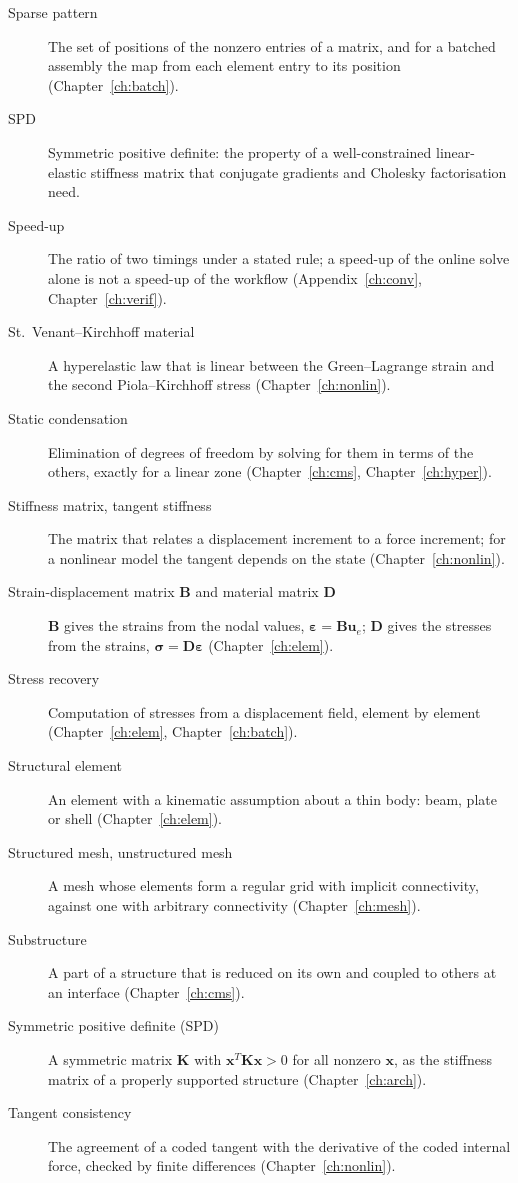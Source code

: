 \begin{description}
\item[Sparse pattern] The set of positions of the nonzero entries of a matrix, and for a batched assembly the map from each element entry to its position (Chapter~\ref{ch:batch}).
\item[SPD] Symmetric positive definite: the property of a well-constrained linear-elastic stiffness matrix that conjugate gradients and Cholesky factorisation need.
\item[Speed-up] The ratio of two timings under a stated rule; a speed-up of the online solve alone is not a speed-up of the workflow (Appendix~\ref{ch:conv}, Chapter~\ref{ch:verif}).
\item[St.~Venant--Kirchhoff material] A hyperelastic law that is linear between the Green--Lagrange strain and the second Piola--Kirchhoff stress (Chapter~\ref{ch:nonlin}).
\item[Static condensation] Elimination of degrees of freedom by solving for them in terms of the others, exactly for a linear zone (Chapter~\ref{ch:cms}, Chapter~\ref{ch:hyper}).
\item[Stiffness matrix, tangent stiffness] The matrix that relates a displacement increment to a force increment; for a nonlinear model the tangent depends on the state (Chapter~\ref{ch:nonlin}).
\item[Strain-displacement matrix $\bm B$ and material matrix $\bm D$] $\bm B$ gives the strains from the nodal values, $\bm\varepsilon=\bm B\bm u_e$; $\bm D$ gives the stresses from the strains, $\bm\sigma=\bm D\bm\varepsilon$ (Chapter~\ref{ch:elem}).
\item[Stress recovery] Computation of stresses from a displacement field, element by element (Chapter~\ref{ch:elem}, Chapter~\ref{ch:batch}).
\item[Structural element] An element with a kinematic assumption about a thin body: beam, plate or shell (Chapter~\ref{ch:elem}).
\item[Structured mesh, unstructured mesh] A mesh whose elements form a regular grid with implicit connectivity, against one with arbitrary connectivity (Chapter~\ref{ch:mesh}).
\item[Substructure] A part of a structure that is reduced on its own and coupled to others at an interface (Chapter~\ref{ch:cms}).
\item[Symmetric positive definite (SPD)] A symmetric matrix $\bm K$ with $\bm x^T\bm K\bm x>0$ for all nonzero $\bm x$, as the stiffness matrix of a properly supported structure (Chapter~\ref{ch:arch}).
\item[Tangent consistency] The agreement of a coded tangent with the derivative of the coded internal force, checked by finite differences (Chapter~\ref{ch:nonlin}).

\end{description}

